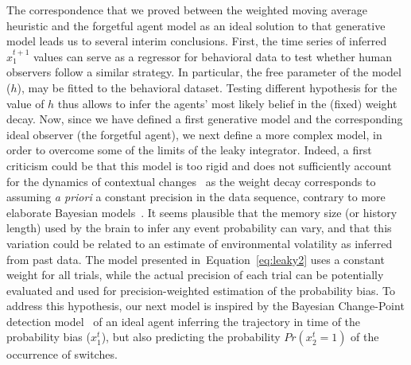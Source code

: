 \documentclass[10pt,letterpaper]{article}
\newcommand{\citep}[1]{\cite{#1}}
\newcommand{\seeFig}[1]{Figure~\ref{fig:#1}}
\newcommand{\seeEq}[1]{Equation~\ref{eq:#1}}
\newcommand{\Rone}[1]{\textbf{\textcolor{magenta}{[rev 1: #1]}}}
\begin{document}
The correspondence that we proved between the weighted moving average heuristic
and the forgetful agent model as an ideal solution to that generative model leads
us to several interim conclusions.
First, the time series of inferred $\hat{x}_1^{t+1}$ values
can serve as a regressor for behavioral data
to test whether human observers follow a similar strategy.
In particular, the free parameter of the model ($h$),
may be fitted to the behavioral dataset.
Testing different hypothesis for the value of $h$ thus allows
to infer the agents' most likely belief in the (fixed) weight decay.
Now, since we have defined a first generative model
and the corresponding ideal observer (the forgetful agent),
we next define a more complex model,
in order to overcome some of the limits of the leaky integrator.
Indeed, a first criticism could be that
this model is too rigid and does not sufficiently
account for the dynamics of contextual changes~\citep{Behrens07}
as the weight decay corresponds to assuming \emph{a priori} a constant precision in the data sequence, contrary to more elaborate Bayesian models~\citep{Vilares2011}.
It seems plausible that the memory size (or history length) used by the brain
to infer any event probability can vary, and that this variation could be related
to an estimate of environmental volatility as inferred from past data.
The model presented in~\seeEq{leaky2} uses a constant weight
for all trials, while the actual precision of each trial
can be potentially evaluated and used
for precision-weighted estimation of the probability bias.
To address this hypothesis, our next model is inspired
by the Bayesian Change-Point detection model~\citep{AdamsMackay2007}
of an ideal agent
inferring the trajectory in time of the probability bias ($x_1^t$),
but also predicting the probability $Pr(x_2^t=1)$ of the occurrence of switches.
\end{document}

